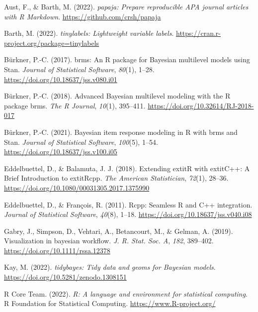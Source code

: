 \documentclass[
  man]{apa7}
\newlength{\cslhangindent}
\newlength{\cslentryspacingunit} %
\newenvironment{CSLReferences}[2] %
 {%
  \setlength{\parindent}{0pt}
  \ifodd #1
  \let\oldpar\par
  \def\par{\hangindent=\cslhangindent\oldpar}
  \fi
  \setlength{\parskip}{#2\cslentryspacingunit}
 }%
 {}
\begin{document}
\hypertarget{refs}{}
\begin{CSLReferences}{1}{0}
\leavevmode{}%
Aust, F., \& Barth, M. (2022). \emph{{papaja}: {Prepare} reproducible {APA} journal articles with {R Markdown}}. \url{https://github.com/crsh/papaja}

\leavevmode{}%
Barth, M. (2022). \emph{{tinylabels}: Lightweight variable labels}. \url{https://cran.r-project.org/package=tinylabels}

\leavevmode{}%
Bürkner, P.-C. (2017). {brms}: An {R} package for {Bayesian} multilevel models using {Stan}. \emph{Journal of Statistical Software}, \emph{80}(1), 1--28. \url{https://doi.org/10.18637/jss.v080.i01}

\leavevmode{}%
Bürkner, P.-C. (2018). Advanced {Bayesian} multilevel modeling with the {R} package {brms}. \emph{The R Journal}, \emph{10}(1), 395--411. \url{https://doi.org/10.32614/RJ-2018-017}

\leavevmode{}%
Bürkner, P.-C. (2021). Bayesian item response modeling in {R} with {brms} and {Stan}. \emph{Journal of Statistical Software}, \emph{100}(5), 1--54. \url{https://doi.org/10.18637/jss.v100.i05}

\leavevmode{}%
Eddelbuettel, D., \& Balamuta, J. J. (2018). {Extending extit{R} with extit{C++}: A Brief Introduction to extit{Rcpp}}. \emph{The American Statistician}, \emph{72}(1), 28--36. \url{https://doi.org/10.1080/00031305.2017.1375990}

\leavevmode{}%
Eddelbuettel, D., \& François, R. (2011). {Rcpp}: Seamless {R} and {C++} integration. \emph{Journal of Statistical Software}, \emph{40}(8), 1--18. \url{https://doi.org/10.18637/jss.v040.i08}

\leavevmode{}%
Gabry, J., Simpson, D., Vehtari, A., Betancourt, M., \& Gelman, A. (2019). Visualization in bayesian workflow. \emph{J. R. Stat. Soc. A}, \emph{182}, 389--402. \url{https://doi.org/10.1111/rssa.12378}

\leavevmode{}%
Kay, M. (2022). \emph{{tidybayes}: Tidy data and geoms for {Bayesian} models}. \url{https://doi.org/10.5281/zenodo.1308151}

\leavevmode{}%
R Core Team. (2022). \emph{R: A language and environment for statistical computing}. R Foundation for Statistical Computing. \url{https://www.R-project.org/}


\end{CSLReferences}
\end{document}
